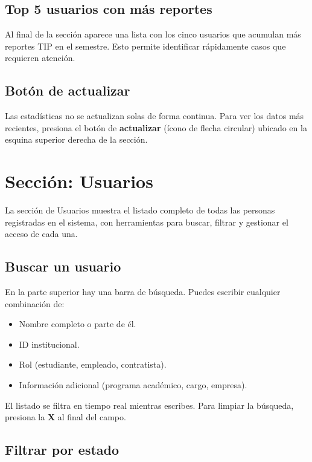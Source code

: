 \documentclass[12pt, a4paper]{article}
\begin{document}
\subsection{Top 5 usuarios con más reportes}

Al final de la sección aparece una lista con los cinco usuarios que
acumulan más reportes TIP en el semestre. Esto permite identificar
rápidamente casos que requieren atención.

\subsection{Botón de actualizar}

Las estadísticas no se actualizan solas de forma continua. Para ver
los datos más recientes, presiona el botón de \textbf{actualizar}
(ícono de flecha circular) ubicado en la esquina superior derecha
de la sección.

\section{Sección: Usuarios}
\label{sec:usuarios}

La sección de Usuarios muestra el listado completo de todas las personas
registradas en el sistema, con herramientas para buscar, filtrar y
gestionar el acceso de cada una.

\subsection{Buscar un usuario}

En la parte superior hay una barra de búsqueda. Puedes escribir
cualquier combinación de:
\begin{itemize}
  \item Nombre completo o parte de él.
  \item ID institucional.
  \item Rol (estudiante, empleado, contratista).
  \item Información adicional (programa académico, cargo, empresa).
\end{itemize}

El listado se filtra en tiempo real mientras escribes.
Para limpiar la búsqueda, presiona la \textbf{X} al final del campo.

\subsection{Filtrar por estado}
\end{document}
